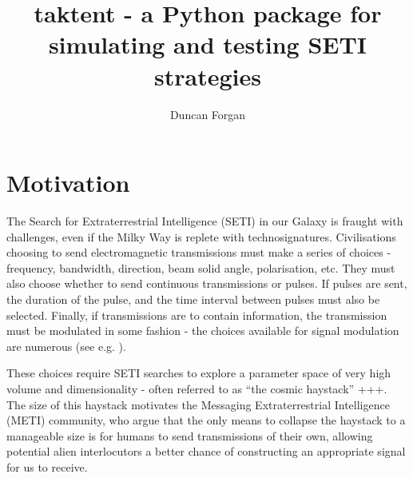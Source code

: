 \documentclass[RNAAS]{aastex62}
\begin{document}
\title{taktent - a Python package for simulating and testing SETI strategies}


\author[0000-0003-1175-4388]{Duncan Forgan}


\keywords{}


\section{Motivation}

The Search for Extraterrestrial Intelligence (SETI) in our Galaxy is fraught with challenges, even if the Milky Way is replete with technosignatures.  Civilisations choosing to send electromagnetic transmissions must make a series of choices - frequency, bandwidth, direction, beam solid angle, polarisation, etc.  They must also choose whether to send continuous transmissions or pulses.  If pulses are sent, the duration of the pulse, and the time interval between pulses must also be selected.  Finally, if transmissions are to contain information, the transmission must be modulated in some fashion - the choices available for signal modulation are numerous (see e.g. \citealt{Messerschmitt2013,Messerschmitt2015}).  

These choices require SETI searches to explore a parameter space of very high volume and dimensionality - often referred to as ``the cosmic haystack'' \citep{TarterPlanetsLife2007}+++.  The size of this haystack motivates the Messaging Extraterrestrial Intelligence (METI) community, who argue that the only means to collapse the haystack to a manageable size is for humans to send transmissions of their own, allowing potential alien interlocutors a better chance of constructing an appropriate signal for us to receive.
\end{document}
